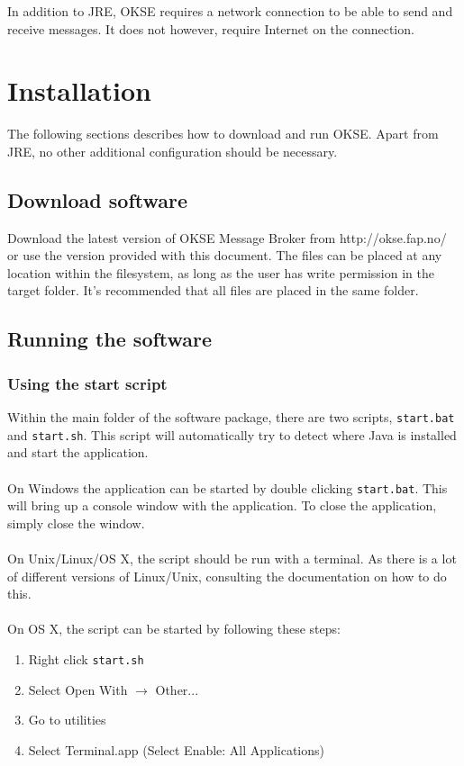 In addition to JRE, OKSE requires a network connection to be able to send and receive messages. It does not however, require Internet on the connection. 

\section{Installation}
\label{Installation_okse}

The following sections describes how to download and run OKSE. Apart from JRE, no other additional configuration should be necessary.

\subsection{Download software}

Download the latest version of OKSE Message Broker from http://okse.fap.no/ or use the version provided with this document. The files can be placed at any location within the filesystem, as long as the user has write permission in the target folder. It's recommended that all files are placed in the same folder.

\subsection{Running the software}

\subsubsection{Using the start script}
Within the main folder of the software package, there are two scripts, \verb!start.bat! and \verb!start.sh!. This script will automatically try to detect where Java is installed and start the application.\\\\On Windows the application can be started by double clicking \verb!start.bat!. This will bring up a console window with the application. To close the application, simply close the window.\\\\On Unix/Linux/OS X, the script should be run with a terminal. As there is a lot of different versions of Linux/Unix, consulting the documentation on how to do this.\\\\On OS X, the script can be started by following these steps:

\begin{enumerate}
\item Right click \verb!start.sh!
\item Select Open With $\rightarrow$ Other...
\item Go to utilities
\item Select Terminal.app (Select Enable: All Applications)
\end{enumerate}

